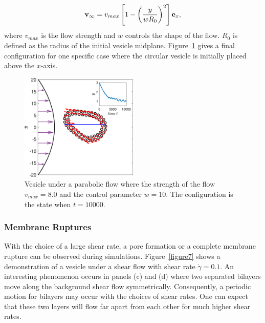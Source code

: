 \documentclass[lineno]{jfm}
\begin{document}
\begin{equation}
{\bf v}_\infty = v_{max}\left[ 1 - \left( \frac{y}{wR_0}\right)^2 \right]{\bf e}_x,
\end{equation}
%
where $v_{max}$ is the flow strength and $w$ controls the shape of the flow. $R_0$ is defined as the radius of the initial vesicle midplane. Figure~\ref{figure6} gives a final configuration for one specific case where the circular vesicle is initially placed above the $x$-axis.


\begin{figure}
\centering
\includegraphics[width=0.5\textwidth]{parabolic.eps}
  \caption{Vesicle under a parabolic flow where the strength of the flow $v_{max}=8.0$ and the control parameter $w=10$. The configuration is the state when $t=10000$.
  }
    \label{figure6}
\end{figure}


\subsubsection{Membrane Ruptures}


With the choice of a large shear rate, a pore formation or a complete membrane rupture can be observed during simulations. Figure~\ref{figure7} shows a demonstration of a vesicle under a shear flow with shear rate $\dot\gamma=0.1$. An interesting phenomenon occurs in panels (c) and (d) where two separated bilayers move along the background shear flow symmetrically. Consequently, a periodic motion for bilayers may occur 
with the choices of shear rates. One can expect that these two layers will flow far apart from each other for much higher shear rates.
\end{document}
